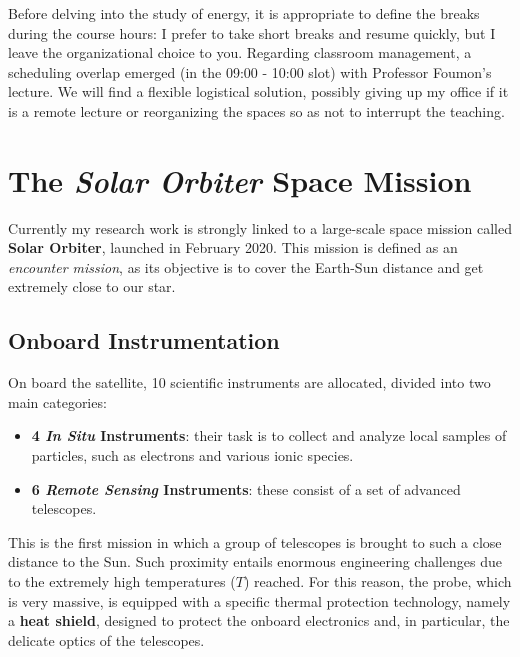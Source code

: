     Before delving into the study of energy, it is appropriate to define the breaks during the course hours: I prefer to take short breaks and resume quickly, but I leave the organizational choice to you. Regarding classroom management, a scheduling overlap emerged (in the 09:00 - 10:00 slot) with Professor Foumon's lecture. We will find a flexible logistical solution, possibly giving up my office if it is a remote lecture or reorganizing the spaces so as not to interrupt the teaching.\section{The \textit{Solar Orbiter} Space Mission}Currently my research work is strongly linked to a large-scale space mission called \textbf{Solar Orbiter}, launched in February 2020. This mission is defined as an \textit{encounter mission}, as its objective is to cover the Earth-Sun distance and get extremely close to our star.\subsection{Onboard Instrumentation}On board the satellite, 10 scientific instruments are allocated, divided into two main categories:\begin{itemize}\item \textbf{4 \textit{In Situ} Instruments}: their task is to collect and analyze local samples of particles, such as electrons and various ionic species.\item \textbf{6 \textit{Remote Sensing} Instruments}: these consist of a set of advanced telescopes.\end{itemize}This is the first mission in which a group of telescopes is brought to such a close distance to the Sun. Such proximity entails enormous engineering challenges due to the extremely high temperatures ($T$) reached. For this reason, the probe, which is very massive, is equipped with a specific thermal protection technology, namely a \textbf{heat shield}, designed to protect the onboard electronics and, in particular, the delicate optics of the telescopes.
    
